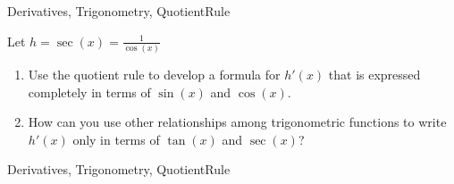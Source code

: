 
\begin{tagblock}{Derivatives, Trigonometry, QuotientRule}
\begin{question}
	






Let $h= \sec(x) =  \frac{1}{\cos(x)}$
\begin{enumerate}


\item Use the quotient rule to develop a formula for $h'(x)$ that is expressed completely in terms of $\sin(x)$ and $\cos(x).$
\vspace{1.5in}


\item How can you use other relationships among trigonometric functions to write $h'(x)$ only in terms of $\tan(x)$ and $\sec(x)$?

\vspace{1.2in}


\end{enumerate}







	









	
	
\begin{tags}
	    Derivatives, Trigonometry, QuotientRule
\end{tags}
	
\begin{diary}
\end{diary}
	
\begin{solution}
	   
\end{solution}
	
\end{question}

\end{tagblock}

